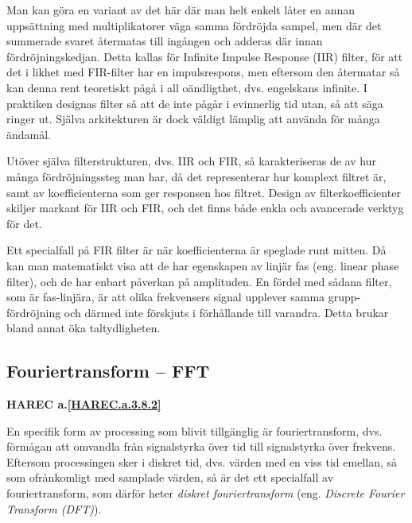 Man kan göra en variant av det här där man helt enkelt låter en annan
uppsättning med multiplikatorer väga samma fördröjda sampel, men där det
summerade svaret återmatas till ingången och adderas där innan
fördröjningskedjan.
Detta kallas för Infinite Impulse Response (IIR) filter, för att det i likhet
med FIR-filter har en impulsrespons, men eftersom den återmatar så kan denna
rent teoretiskt pågå i all oändligthet, dvs. engelskans infinite.
I praktiken designas filter så att de inte pågår i evinnerlig tid utan, så att
säga ringer ut.
Själva arkitekturen är dock väldigt lämplig att använda för många ändamål.

Utöver själva filterstrukturen, dvs. IIR och FIR, så karakteriseras de av hur
många fördröjningssteg man har, då det representerar hur komplext filtret är,
samt av koefficienterna som ger responsen hos filtret.
Design av filterkoefficienter skiljer markant för IIR och FIR, och det finns
både enkla och avancerade verktyg för det.

Ett specialfall på FIR filter är när koefficienterna är speglade runt mitten.
Då kan man matematiskt visa att de har egenskapen av linjär fas (eng. linear
phase filter), och de har enbart påverkan på amplituden.
En fördel med sådana filter, som är fas-linjära, är att olika frekvensers
signal upplever samma grupp-fördröjning och därmed inte förskjuts i förhållande
till varandra.
Detta brukar bland annat öka taltydligheten.

\subsection{Fouriertransform -- FFT}
\textbf{HAREC a.\ref{HAREC.a.3.8.2}\label{myHAREC.a.3.8.2}}

En specifik form av processing som blivit tillgänglig är fouriertransform,
dvs. förmågan att omvandla från signalstyrka över tid till signalstyrka över
frekvens.
Eftersom processingen sker i diskret tid, dvs. värden med en viss tid emellan,
så som ofrånkomligt med samplade värden, så är det ett specialfall av
fouriertransform, som därför heter \emph{diskret fouriertransform} (eng.
\emph{Discrete Fourier Transform (DFT)}).

